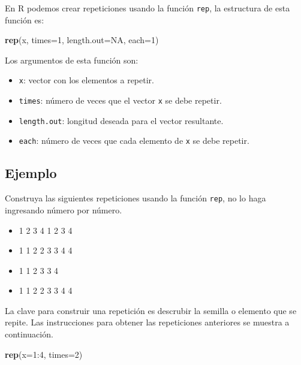 \documentclass[10pt,]{krantz}
\makeatletter
\newenvironment{Shaded}{\begin{snugshade}}{\end{snugshade}}
\newcommand{\KeywordTok}[1]{\textcolor[rgb]{0.13,0.29,0.53}{\textbf{{#1}}}}
\newcommand{\DataTypeTok}[1]{\textcolor[rgb]{0.13,0.29,0.53}{{#1}}}
\newcommand{\DecValTok}[1]{\textcolor[rgb]{0.00,0.00,0.81}{{#1}}}
\newcommand{\OtherTok}[1]{\textcolor[rgb]{0.56,0.35,0.01}{{#1}}}
\newcommand{\NormalTok}[1]{{#1}}
\providecommand{\tightlist}{%
  \setlength{\itemsep}{0pt}\setlength{\parskip}{0pt}}
\let\proglang=\textsf
\newenvironment{kframe}{%
\medskip{}
\setlength{\fboxsep}{.8em}
 \def\at@end@of@kframe{}%
 \ifinner\ifhmode%
  \def\at@end@of@kframe{\end{minipage}}%
  \begin{minipage}{\columnwidth}%
 \fi\fi%
 \def\FrameCommand##1{\hskip\@totalleftmargin \hskip-\fboxsep
 \colorbox{shadecolor}{##1}\hskip-\fboxsep
     \hskip-\linewidth \hskip-\@totalleftmargin \hskip\columnwidth}%
 \MakeFramed {\advance\hsize-\width
   \@totalleftmargin\z@ \linewidth\hsize
   \@setminipage}}%
 {\par\unskip\endMakeFramed%
 \at@end@of@kframe}
\renewenvironment{Shaded}{\begin{kframe}}{\end{kframe}}
\makeatother
\begin{document}
En \proglang{R} podemos crear repeticiones usando la función
\texttt{rep}, la estructura de esta función es:

\begin{Shaded}
\begin{Highlighting}[]
\KeywordTok{rep}\NormalTok{(x, }\DataTypeTok{times=}\DecValTok{1}\NormalTok{, }\DataTypeTok{length.out=}\OtherTok{NA}\NormalTok{, }\DataTypeTok{each=}\DecValTok{1}\NormalTok{)}
\end{Highlighting}
\end{Shaded}

Los argumentos de esta función son:

\begin{itemize}
\tightlist
\item
  \texttt{x}: vector con los elementos a repetir.
\item
  \texttt{times}: número de veces que el vector \texttt{x} se debe
  repetir.
\item
  \texttt{length.out}: longitud deseada para el vector resultante.
\item
  \texttt{each}: número de veces que cada elemento de \texttt{x} se debe
  repetir.
\end{itemize}

\subsection*{Ejemplo}\label{ejemplo-11}


Construya las siguientes repeticiones usando la función \texttt{rep}, no
lo haga ingresando número por número.

\begin{itemize}
\tightlist
\item
  1 2 3 4 1 2 3 4
\item
  1 1 2 2 3 3 4 4
\item
  1 1 2 3 3 4
\item
  1 1 2 2 3 3 4 4
\end{itemize}

La clave para construir una repetición es descrubir la semilla o
elemento que se repite. Las instrucciones para obtener las repeticiones
anteriores se muestra a continuación.

\begin{Shaded}
\begin{Highlighting}[]
\KeywordTok{rep}\NormalTok{(}\DataTypeTok{x=}\DecValTok{1}\NormalTok{:}\DecValTok{4}\NormalTok{, }\DataTypeTok{times=}\DecValTok{2}\NormalTok{)}
\end{Highlighting}
\end{Shaded}
\end{document}
